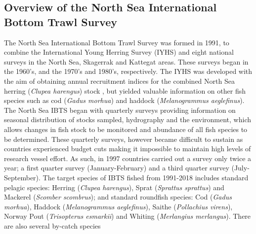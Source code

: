 \documentclass[a4paper 12pt]{article}
\numberwithin{equation}{section}
\begin{document}
\subsection{Overview of the North Sea International Bottom Trawl Survey}
\label{overview}
\indent The North Sea International Bottom Trawl Survey was formed in 1991, to combine the International Young Herring Survey (IYHS) and eight national surveys in the North Sea, Skagerrak and Kattegat areas. These surveys began in the 1960's, and the 1970's and 1980's, respectively. The IYHS was developed with the aim of obtaining annual recruitment indices for the combined North Sea herring (\textit{Clupea harengus}) stock \citep{ICES2012}, but yielded valuable information on other fish species such as cod (\textit{Gadus morhua}) and haddock (\textit{Melanogrammus aeglefinus}).\\
\indent The North Sea IBTS began with quarterly surveys providing information on seasonal distribution of stocks sampled, hydrography and the environment, which allows changes in fish stock to be monitored and abundance of all fish species to be determined. These quarterly surveys, however became difficult to sustain as countries experienced budget cuts making it impossible to maintain high levels of research vessel effort. As such, in 1997 countries carried out a survey only twice a year; a first quarter survey (January-February) and a third quarter survey (July-September). The target species of IBTS fished from 1991-2018 includes standard pelagic species: Herring (\textit{Clupea harengus}), Sprat (\textit{Sprattus sprattus}) and Mackerel (\textit{Scomber scombrus}); and standard roundfish species: Cod (\textit{Gadus morhua}), Haddock (\textit{Melanogrammus aeglefinus}), Saithe (\textit{Pollachius virens}),  Norway Pout (\textit{Trisopterus esmarkii})  and Whiting (\textit{Merlangius merlangus}). There are also several by-catch species \citep[see for example,][]{ICES2006}
\end{document}
